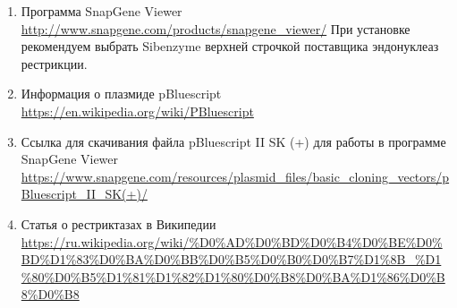 \begin{enumerate}
    \item Программа SnapGene Viewer \url{http://www.snapgene.com/products/snapgene_viewer/} При установке рекомендуем выбрать Sibenzyme верхней строчкой поставщика эндонуклеаз рестрикции. 
    \item Информация о плазмиде pBluescript\\ \url{https://en.wikipedia.org/wiki/PBluescript}
    \item Ссылка для скачивания файла pBluescript II SK (+) для работы в программе SnapGene Viewer \url{https://www.snapgene.com/resources/plasmid_files/basic_cloning_vectors/pBluescript_II_SK(+)/}
    \item Статья о рестриктазах в Википедии \url{https://ru.wikipedia.org/wiki/%D0%AD%D0%BD%D0%B4%D0%BE%D0%BD%D1%83%D0%BA%D0%BB%D0%B5%D0%B0%D0%B7%D1%8B_%D1%80%D0%B5%D1%81%D1%82%D1%80%D0%B8%D0%BA%D1%86%D0%B8%D0%B8}
\end{enumerate}
